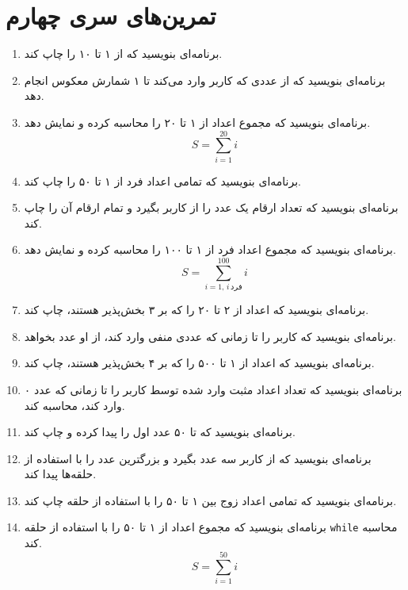 \documentclass[b5paper,12pt]{article}
\begin{document}
	\section*{تمرین‌های سری چهارم}
	\begin{enumerate}
		\item برنامه‌ای بنویسید که از ۱ تا ۱۰ را چاپ کند.
		
		\item برنامه‌ای بنویسید که از عددی که کاربر وارد می‌کند تا ۱ شمارش معکوس انجام دهد.
		
		\item برنامه‌ای بنویسید که مجموع اعداد از ۱ تا ۲۰ را محاسبه کرده و نمایش دهد.
		\[
		S = \sum_{i=1}^{20} i
		\]
		
		\item برنامه‌ای بنویسید که تمامی اعداد فرد از ۱ تا ۵۰ را چاپ کند.
		
		\item برنامه‌ای بنویسید که تعداد ارقام یک عدد را از کاربر بگیرد و تمام ارقام آن را چاپ کند.
		
		\item برنامه‌ای بنویسید که مجموع اعداد فرد از ۱ تا ۱۰۰ را محاسبه کرده و نمایش دهد.
		\[
		S = \sum_{i=1, \, i \, \text{فرد}}^{100} i
		\]
		
		\item برنامه‌ای بنویسید که اعداد از ۲ تا ۲۰ را که بر ۳ بخش‌پذیر هستند، چاپ کند.
		
		\item برنامه‌ای بنویسید که کاربر را تا زمانی که عددی منفی وارد کند، از او عدد بخواهد.
		
		\item برنامه‌ای بنویسید که اعداد از ۱ تا ۵۰۰ را که بر ۴ بخش‌پذیر هستند، چاپ کند.
		
		\item برنامه‌ای بنویسید که تعداد اعداد مثبت وارد شده توسط کاربر را تا زمانی که عدد ۰ وارد کند، محاسبه کند.
		
		\item برنامه‌ای بنویسید که تا ۵۰ عدد اول را پیدا کرده و چاپ کند.
		
		\item برنامه‌ای بنویسید که از کاربر سه عدد بگیرد و بزرگترین عدد را با استفاده از حلقه‌ها پیدا کند.
		
		\item برنامه‌ای بنویسید که تمامی اعداد زوج بین ۱ تا ۵۰ را با استفاده از حلقه چاپ کند.
		
		\item برنامه‌ای بنویسید که مجموع اعداد از ۱ تا ۵۰ را با استفاده از حلقه \texttt{while} محاسبه کند.
		\[
		S = \sum_{i=1}^{50} i
		\]
		

\end{enumerate}
\end{document}
